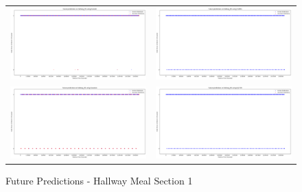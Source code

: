 \begin{figure}
  \begin{tabular}{cc}
    {\includegraphics[width = 3in]{images/results/Future_hallway_M1_Duckett.png}} &
    {\includegraphics[width = 3in]{images/results/Future_hallway_M1_FreMEn.png}} \\
    {\includegraphics[width = 3in]{images/results/Future_hallway_M1_Gaussian.png}} &
    {\includegraphics[width = 3in]{images/results/Future_hallway_M1_HyT-EM.png}} \\
  \end{tabular}
  \caption{Future Predictions - Hallway Meal Section 1}
\end{figure}

